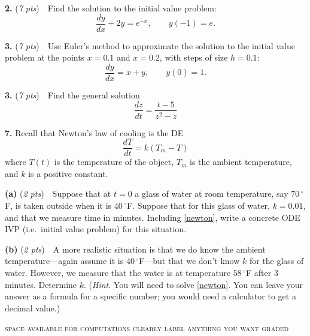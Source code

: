 \documentclass[11pt,reqno]{amsart}
\newcommand{\dydx}{\frac{dy}{dx}}
\newcommand{\prob}[1]{\bigskip\noindent\textbf{#1.} }
\newcommand{\pts}[1]{(\emph{#1 pts})}
\newcommand{\probpts}[2]{\prob{#1} \pts{#2} \,\,}
\newcommand{\ppartpts}[2]{\textbf{(#1)} \pts{#2} \,\,}
\newcommand{\epartpts}[2]{\medskip\noindent \textbf{(#1)} \pts{#2} \,\,}
\begin{document}
\probpts{2}{7}  Find the solution to the initial value problem:
	$$\dydx + 2y = e^{-x}, \qquad y(-1)=e.$$
\vfill


\newpage
\probpts{3}{7}  Use Euler's method to approximate the solution to the initial value problem at the points $x=0.1$ and $x=0.2$, with steps of size $h=0.1$:
	$$\dydx = x+ y, \qquad y(0)=1.$$
\vfill

\probpts{3}{7}  Find the general solution
	$$\frac{dz}{dt} = \frac{t-5}{z^2-z}$$
\vfill

\prob{7}  Recall that Newton's law of cooling is the DE
\begin{equation}
    \frac{dT}{dt} = k (T_m - T) \label{newton}
\end{equation}
where $T(t)$ is the temperature of the object, $T_m$ is the ambient temperature, and $k$ is a positive constant.

\ppartpts{a}{2}  Suppose that at $t=0$ a glass of water at room temperature, say $70\,{}^\circ$F, is taken outside when it is $40\,{}^\circ$F.  Suppose that for this glass of water, $k=0.01$, and that we measure time in minutes.  Including \eqref{newton}, write a concrete ODE IVP (i.e.~initial value problem) for this situation.
\vfill

\epartpts{b}{2}  A more realistic situation is that we do know the ambient temperature---again assume it is $40\,{}^\circ$F---but that we don't know $k$ for the glass of water.  However, we measure that the water is at temperature $58\,{}^\circ$F after $3$ minutes.  Determine $k$.  (\emph{Hint}.  You will need to solve \eqref{newton}.  You can leave your answer as a formula for a specific number; you would need a calculator to get a decimal value.)
\vfill



\noindent \hrulefill

\scriptsize \centerline{ \textsc{space available for computations \hspace{30mm} clearly label anything you want graded}}
\vspace{5.0in}
\end{document}
